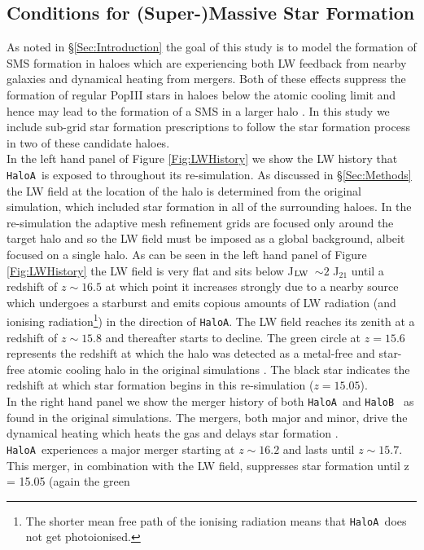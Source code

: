 \documentclass[twocolumn,iop,revtex4]{openjournal}
\newcommand{\JLW} {J$_{\rm LW}$}
\newcommand{\ha} {\texttt{HaloA~}}
\newcommand{\hb} {\texttt{HaloB~}}
\newcommand{\hac} {\texttt{HaloA}}
\begin{document}
\subsection{Conditions for (Super-)Massive Star Formation}
As noted in \S \ref{Sec:Introduction} the goal of this study is to model the formation of
SMS formation in haloes which are experiencing both LW feedback from nearby galaxies and
dynamical heating from mergers. Both of these effects suppress the formation of regular
PopIII stars in haloes
below the atomic cooling limit and hence may lead to the formation of a SMS in a larger
halo  \citep[as was found in][]{Wise_2019}. In this study we include 
sub-grid star formation prescriptions to follow the star formation process in 
two of these candidate haloes.\\
\indent In the left hand panel of Figure \ref{Fig:LWHistory} we show the LW history that \ha is
exposed to throughout its re-simulation. As discussed in \S \ref{Sec:Methods} the LW field at the
location of the halo is determined from the original simulation, which included star formation
in all of the surrounding haloes. In the re-simulation the adaptive mesh refinement
grids are focused only around the
target halo and so the LW field must be imposed as a global background, albeit focused on a single
halo. As can be seen in the left hand panel of Figure \ref{Fig:LWHistory} the LW field is
very flat and sits below \JLW \ $\sim 2$
J$_{21}$ until a redshift of $z \sim 16.5$ at which point it increases strongly due to a nearby source
which undergoes a starburst and emits copious amounts of LW radiation
(and ionising radiation\footnote{The
  shorter mean free path of the ionising radiation means that \ha does not get photoionised.}) in the
direction of \hac. The LW field reaches its zenith at a redshift of $z \sim 15.8$ and thereafter
starts to decline. The green circle at $z = 15.6$ represents the redshift at which the halo was
detected as a metal-free and star-free atomic cooling halo in the original simulations
\citep[see][for details]{Regan_2020}. The black star indicates the redshift at which star
formation begins in this re-simulation ($z = 15.05$). \\
\indent In the right hand panel we show the merger history of both \ha and \hb
as found in the original simulations. The mergers, both major and minor, drive the dynamical heating
which heats the gas and delays star formation \citep{Wise_2019}. 
\ha experiences a major merger starting at $z \sim 16.2$ and lasts until $z \sim 15.7$. This
merger, in combination with the LW field, suppresses star formation until z = 15.05 (again the green
\end{document}
